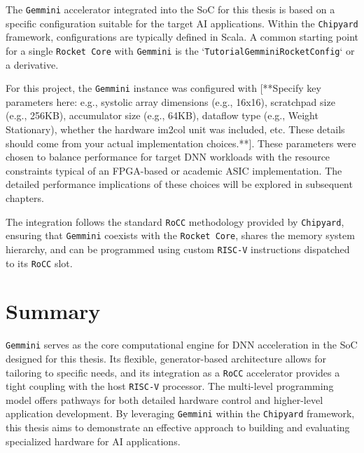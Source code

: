 The \texttt{Gemmini} accelerator integrated into the SoC for this thesis is based on a specific configuration suitable for the target AI applications. Within the \texttt{Chipyard} framework, configurations are typically defined in Scala. A common starting point for a single \texttt{Rocket Core} with \texttt{Gemmini} is the `\texttt{TutorialGemminiRocketConfig}` or a derivative.

For this project, the \texttt{Gemmini} instance was configured with [**Specify key parameters here: e.g., systolic array dimensions (e.g., 16x16), scratchpad size (e.g., 256KB), accumulator size (e.g., 64KB), dataflow type (e.g., Weight Stationary), whether the hardware im2col unit was included, etc. These details should come from your actual implementation choices.**]. These parameters were chosen to balance performance for target DNN workloads with the resource constraints typical of an FPGA-based or academic ASIC implementation. The detailed performance implications of these choices will be explored in subsequent chapters.

The integration follows the standard \texttt{RoCC} methodology provided by \texttt{Chipyard}, ensuring that \texttt{Gemmini} coexists with the \texttt{Rocket Core}, shares the memory system hierarchy, and can be programmed using custom \texttt{RISC-V} instructions dispatched to its \texttt{RoCC} slot.

\section{Summary}
\label{sec:gemmini_summary}
\texttt{Gemmini} serves as the core computational engine for DNN acceleration in the SoC designed for this thesis. Its flexible, generator-based architecture allows for tailoring to specific needs, and its integration as a \texttt{RoCC} accelerator provides a tight coupling with the host \texttt{RISC-V} processor. The multi-level programming model offers pathways for both detailed hardware control and higher-level application development. By leveraging \texttt{Gemmini} within the \texttt{Chipyard} framework, this thesis aims to demonstrate an effective approach to building and evaluating specialized hardware for AI applications.